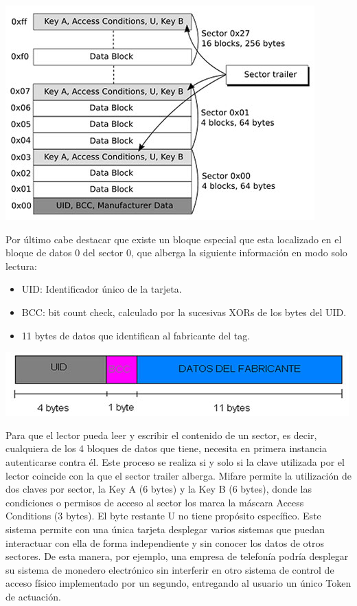 \includegraphics{memoria/images/fig4-3.jpg}

Por último cabe destacar que existe un bloque especial que esta
localizado en el bloque de datos 0 del sector 0, que alberga la
siguiente información en modo solo lectura:

\begin{itemize}
\itemsep1pt\parskip0pt
\item
  UID: Identificador único de la tarjeta.
\item
  BCC: bit count check, calculado por la sucesivas XORs de los bytes del
  UID.
\item
  11 bytes de datos que identifican al fabricante del tag.
\end{itemize}

\includegraphics{memoria/images/fig4-2.jpg}

Para que el lector pueda leer y escribir el contenido de un sector, es
decir, cualquiera de los 4 bloques de datos que tiene, necesita en
primera instancia autenticarse contra él. Este proceso se realiza si y
solo si la clave utilizada por el lector coincide con la que el sector
trailer alberga. Mifare permite la utilización de dos claves por sector,
la Key A (6 bytes) y la Key B (6 bytes), donde las condiciones o
permisos de acceso al sector los marca la máscara Access Conditions (3
bytes). El byte restante U no tiene propósito específico. Este sistema
permite con una única tarjeta desplegar varios sistemas que puedan
interactuar con ella de forma independiente y sin conocer los datos de
otros sectores. De esta manera, por ejemplo, una empresa de telefonía
podría desplegar su sistema de monedero electrónico sin interferir en
otro sistema de control de acceso físico implementado por un segundo,
entregando al usuario un único Token de actuación.


